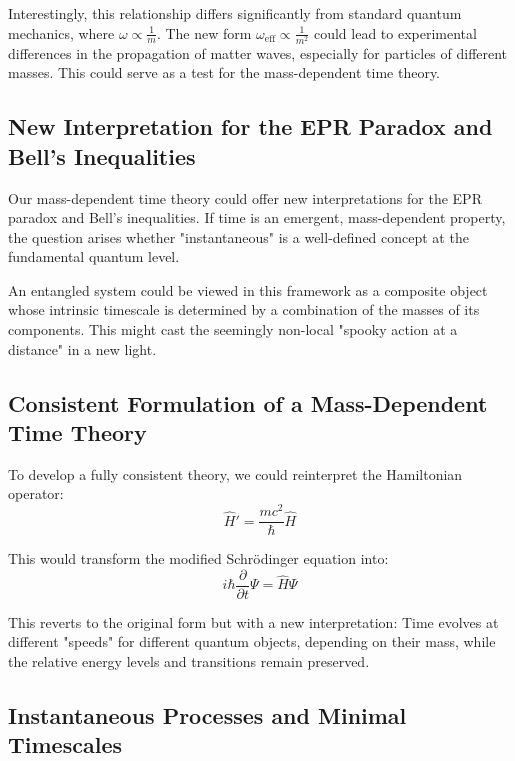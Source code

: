 \documentclass{article}
\begin{document}
	Interestingly, this relationship differs significantly from standard quantum mechanics, where $\omega \propto \frac{1}{m}$. The new form $\omega_{\text{eff}} \propto \frac{1}{m^2}$ could lead to experimental differences in the propagation of matter waves, especially for particles of different masses. This could serve as a test for the mass-dependent time theory.
	
	\subsection{New Interpretation for the EPR Paradox and Bell's Inequalities}
	
	Our mass-dependent time theory could offer new interpretations for the EPR paradox and Bell's inequalities. If time is an emergent, mass-dependent property, the question arises whether "instantaneous" is a well-defined concept at the fundamental quantum level.
	
	An entangled system could be viewed in this framework as a composite object whose intrinsic timescale is determined by a combination of the masses of its components. This might cast the seemingly non-local "spooky action at a distance" in a new light.
	
	\subsection{Consistent Formulation of a Mass-Dependent Time Theory}
	
	To develop a fully consistent theory, we could reinterpret the Hamiltonian operator:
	\begin{equation}
		\hat{H}' = \frac{mc^2}{\hbar} \hat{H}
	\end{equation}
	
	This would transform the modified Schrödinger equation into:
	\begin{equation}
		i\hbar \frac{\partial}{\partial t}\Psi = \hat{H}\Psi
	\end{equation}
	
	This reverts to the original form but with a new interpretation: Time evolves at different "speeds" for different quantum objects, depending on their mass, while the relative energy levels and transitions remain preserved.
	
	\subsection{Instantaneous Processes and Minimal Timescales}
	
\end{document}
